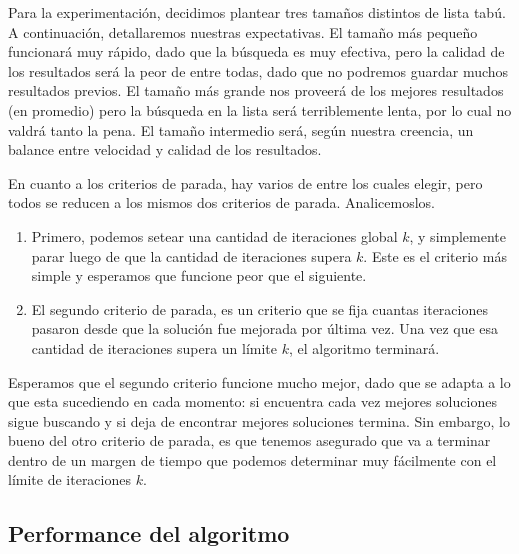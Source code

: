 Para la experimentación, decidimos plantear tres tamaños distintos de lista tabú.
A continuación, detallaremos nuestras expectativas.
El tamaño más pequeño funcionará muy rápido, dado que la búsqueda es muy efectiva, pero la calidad de los resultados será la peor de entre todas, dado que no podremos guardar muchos resultados previos.
El tamaño más grande nos proveerá de los mejores resultados (en promedio) pero la búsqueda en la lista será terriblemente lenta, por lo cual no valdrá tanto la pena.
El tamaño intermedio será, según nuestra creencia, un balance entre velocidad y calidad de los resultados.

En cuanto a los criterios de parada, hay varios de entre los cuales elegir, pero todos se reducen a los mismos dos criterios de parada. Analicemoslos.

\begin{enumerate}
  \item Primero, podemos setear una cantidad de iteraciones global $k$, y simplemente parar luego de que la cantidad de iteraciones supera $k$. Este es el criterio más simple y esperamos que funcione peor que el siguiente.
  \item El segundo criterio de parada, es un criterio que se fija cuantas iteraciones pasaron desde que la solución fue mejorada por última vez. Una vez que esa cantidad de iteraciones supera un límite $k$, el algoritmo terminará.
\end{enumerate}

Esperamos que el segundo criterio funcione mucho mejor, dado que se adapta a lo que esta sucediendo en cada momento: si encuentra cada vez mejores soluciones sigue buscando y si deja de encontrar mejores soluciones termina. Sin embargo, lo bueno del otro criterio de parada, es que tenemos asegurado que va a terminar dentro de un margen de tiempo que podemos determinar muy fácilmente con el límite de iteraciones $k$.





\subsection{Performance del algoritmo}



